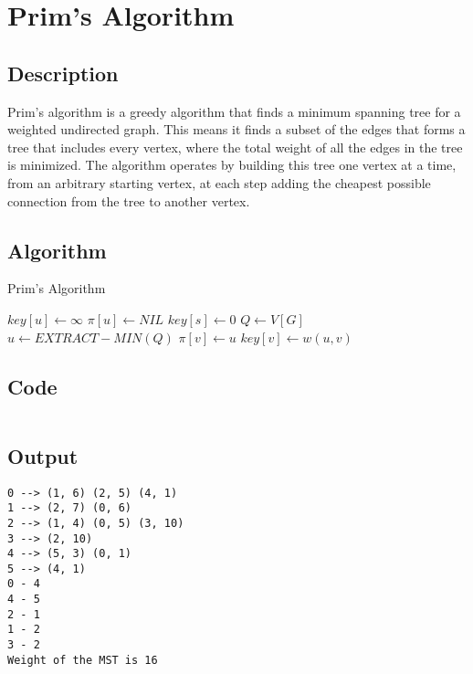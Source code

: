 \section{Prim's Algorithm}

\subsection{Description}
Prim's algorithm is a greedy algorithm that finds a minimum spanning tree for a weighted undirected graph. This means it finds a subset of the edges that forms a tree that includes every vertex, where the total weight of all the edges in the tree is minimized. The algorithm operates by building this tree one vertex at a time, from an arbitrary starting vertex, at each step adding the cheapest possible connection from the tree to another vertex.

\subsection{Algorithm}


\begin{algorithm}[H]
    \caption{Prim's Algorithm}
    \begin{algorithmic}[1]
        \State $key[u] \gets \infty$
        \State $\pi[u] \gets NIL$
        \EndFor
        \State $key[s] \gets 0$
        \State $Q \gets V[G]$
        \State $u \gets EXTRACT-MIN(Q)$
        \State $\pi[v] \gets u$
        \State $key[v] \gets w(u, v)$
        \EndIf
        \EndFor
        \EndWhile
        \EndProcedure
    \end{algorithmic}
\end{algorithm}

\subsection{Code}

\inputminted[fontsize=\footnotesize,bgcolor=bg,linenos,autogobble,frame=single,framerule=0.01pt,rulecolor=FSBorder,stripall,breaklines]{c++}{code/prims.cpp}

\subsection{Output}

\begin{lstlisting}[style=output]
0 --> (1, 6) (2, 5) (4, 1)
1 --> (2, 7) (0, 6)
2 --> (1, 4) (0, 5) (3, 10)
3 --> (2, 10)
4 --> (5, 3) (0, 1)
5 --> (4, 1)
0 - 4
4 - 5
2 - 1
1 - 2
3 - 2
Weight of the MST is 16
\end{lstlisting}